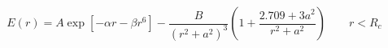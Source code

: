 


$$
E\left(r\right) = A \exp\left[-\alpha r - \beta r^6\right] -
\frac{B}{\left(r^2+a^2\right)^3} \left(1+\frac{2.709+3a^2}{r^2+a^2}\right)
   \qquad r < R_c 
$$


